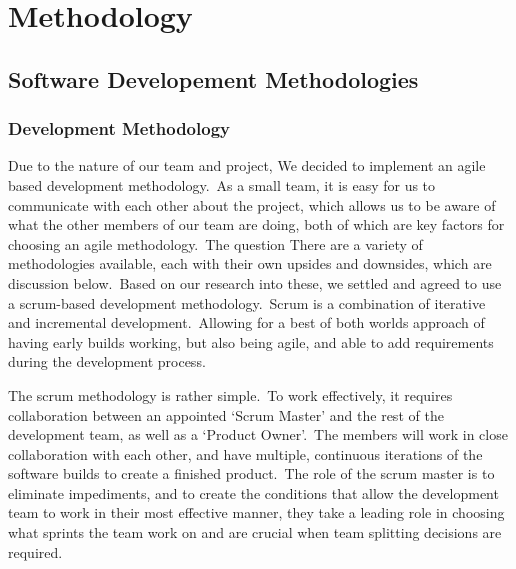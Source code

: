 \chapter{Methodology} \label{ch:methodology}
    \section{Software Developement Methodologies}
        \subsection{Development Methodology}
            Due to the nature of our team and project, We decided to implement an agile based development methodology.\
            As a small team, it is easy for us to communicate with each other about the project, which allows us to be
            aware of what the other members of our team are doing, both of which are key factors for choosing an agile
            methodology.\ The question There are a variety of methodologies available, each with their own upsides and
            downsides, which are discussion below.\ Based on our research into these, we settled and agreed to use a
            scrum-based development methodology.\ Scrum is a combination of iterative and incremental development.\
            Allowing for a best of both worlds approach of having early builds working, but also being agile, and able
            to add requirements during the development process\cite{srivastava_2017_scrum}.

            The scrum methodology is rather simple.\ To work effectively, it requires collaboration between an appointed
            ‘Scrum Master’ and the rest of the development team, as well as a ‘Product Owner’.\ The members will work in
            close collaboration with each other, and have multiple, continuous iterations of the software builds to
            create a finished product.\ The role of the scrum master is to eliminate
            impediments\cite{srivastava_2017_scrum}, and to create the conditions that allow the development team to
            work in their most effective manner, they take a leading role in choosing what sprints the team work on and
            are crucial when team splitting decisions are required.


